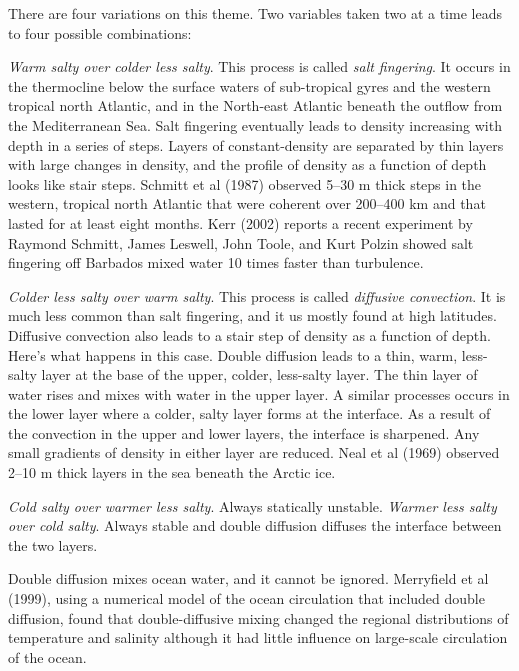 There are four variations on this theme. Two variables taken two at a
time leads to four possible combinations:
\begin{enumerate}
\vitem \textit{Warm salty over colder less salty}. This process is
called \textit{salt fingering}. It occurs in the thermocline below the
surface waters of sub-tropical gyres and the western tropical north
Atlantic, and in the North-east Atlantic beneath the outflow from the
Mediterranean Sea. Salt fingering eventually leads to density
increasing with depth in a series of steps. Layers of constant-density
are separated by thin layers with large changes in density, and the
profile of density as a function of depth looks like stair
steps. Schmitt et al (1987) observed 5--30 m thick steps in the
western, tropical north Atlantic that were coherent over 200--400 km
and that lasted for at least eight months. Kerr (2002) reports a
recent experiment by Raymond Schmitt, James Leswell, John Toole, and
Kurt Polzin showed salt fingering off Barbados mixed water 10 times
faster than turbulence.

\vitem \textit{Colder less salty over warm salty}.  This process is
called \textit{diffusive convection}. It is much less common than salt fingering, and
it us mostly found at high latitudes. Diffusive convection also leads
to a stair step of density as a function of depth. Here's what happens
in this case. Double diffusion leads to a thin, warm, less-salty layer
at the base of the upper, colder, less-salty layer. The thin layer of
water rises and mixes with water in the upper layer. A similar
processes occurs in the lower layer where a colder, salty layer forms
at the interface. As a result of the convection in the upper and lower
layers, the interface is sharpened. Any small gradients of density in
either layer are reduced. Neal et al (1969) observed 2--10 m thick
layers in the sea beneath the Arctic ice.

\vitem \textit{Cold salty over warmer less salty}. Always statically
unstable. \vitem \textit{Warmer less salty over cold salty}. Always
stable and double diffusion diffuses the interface between the two
layers.
\end{enumerate}

Double diffusion mixes ocean water, and it cannot be
ignored. Merryfield et al (1999), using a numerical model of the ocean
circulation that included double diffusion, found that
double-diffusive mixing changed the regional distributions of
temperature and salinity although it had little influence on
large-scale circulation of the ocean.

